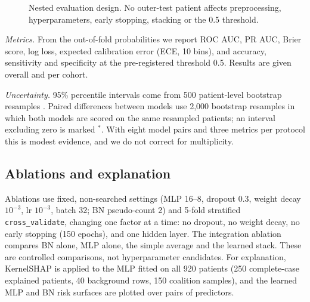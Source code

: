 \documentclass[conference]{IEEEtran}
\newcommand{\code}[1]{\texttt{\small #1}}
\begin{document}
\begin{figure}[t]
\centering
{}
\caption{Nested evaluation design. No outer-test patient affects preprocessing, hyperparameters, early stopping, stacking or the 0.5 threshold.}
\label{fig:protocol}
\end{figure}

\textit{Metrics.} From the out-of-fold probabilities we report ROC AUC, PR AUC, Brier score, log loss, expected calibration error (ECE, 10 bins), and accuracy, sensitivity and specificity at the pre-registered threshold 0.5. Results are given overall and per cohort.

\textit{Uncertainty.} 95\% percentile intervals come from 500 patient-level bootstrap resamples \cite{efron}. Paired differences between models use 2{,}000 bootstrap resamples in which both models are scored on the same resampled patients; an interval excluding zero is marked $^{*}$. With eight model pairs and three metrics per protocol this is modest evidence, and we do not correct for multiplicity.

\subsection{Ablations and explanation}
Ablations use fixed, non-searched settings (MLP 16--8, dropout 0.3, weight decay $10^{-3}$, lr $10^{-3}$, batch 32; BN pseudo-count 2) and 5-fold stratified \code{cross\_validate}, changing one factor at a time: no dropout, no weight decay, no early stopping (150 epochs), and one hidden layer. The integration ablation compares BN alone, MLP alone, the simple average and the learned stack. These are controlled comparisons, not hyperparameter candidates. For explanation, KernelSHAP \cite{shap} is applied to the MLP fitted on all 920 patients (250 complete-case explained patients, 40 background rows, 150 coalition samples), and the learned MLP and BN risk surfaces are plotted over pairs of predictors.
\end{document}
